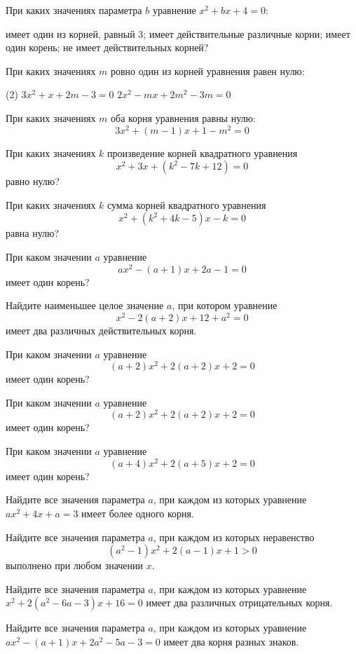 \begin{class}[number=3]
	\begin{listofex}
		\item При каких значениях параметра \(b\) уравнение \(x^2+bx+4=0\):
		\begin{tasks}
			\task имеет один из корней, равный \( 3 \);
			\task имеет действительные различные корни;
			\task имеет один корень;
			\task не имеет действительных корней?
		\end{tasks}
		\item При каких значениях \(m\) ровно один из корней уравнения равен нулю:
		\begin{tasks}(2)
			\task \( 3x^2+x+2m-3=0 \)
			\task \( 2x^2-mx+2m^2-3m=0 \)
		\end{tasks}
		\item При каких значениях \(m\) оба корня уравнения равны нулю: \[ 3x^2+(m-1)x+1-m^2=0 \]
		\item При каких значениях \(k\) произведение корней квадратного уравнения \[x^2+3x+(k^2-7k+12)=0\] равно нулю?
		\item При каких значениях \(k\) сумма корней квадратного уравнения \[x^2+(k^2+4k-5)x-k=0\] равна нулю?
		\item При каком значении \(a\) уравнение \[ax^2-(a+1)x+2a-1=0\] имеет один корень?
		\item Найдите наименьшее целое значение \(a\), при котором уравнение \[x^2-2(a+2)x+12+a^2=0\] имеет два различных действительных корня.
		\item При каком значении \(a\) уравнение \[(a+2)x^2+2(a+2)x+2=0\] имеет один корень?
	\end{listofex}
\end{class}

\begin{class}[number=4]
	\begin{listofex}
		\item При каком значении \( a \) уравнение
		\[ (a+2)x^2+2(a+2)x+2=0 \]
		имеет один корень?
		\item При каком значении \( a \) уравнение
		\[ (a+4)x^2+2(a+5)x+2=0 \]
		имеет один корень?
		\item Найдите все значения параметра \( a \), при каждом из которых уравнение \( ax^2+4x+a=3 \) имеет более одного корня.
		\item Найдите все значения параметра \( a \), при каждом из которых неравенство
		\[ (a^2-1)x^2+2(a-1)x+1>0 \]
		выполнено при любом значении \( x \).
		\item Найдите все значения параметра \( a \), при каждом из которых уравнение \( x^2+2(a^2-6a-3)x+16=0 \) имеет два различных отрицательных корня.
		\item Найдите все значения параметра \( a \), при каждом из которых уравнение \( ax^2-(a+1)x+2a^2-5a-3=0 \) имеет два корня разных знаков.
	\end{listofex}
\end{class}

